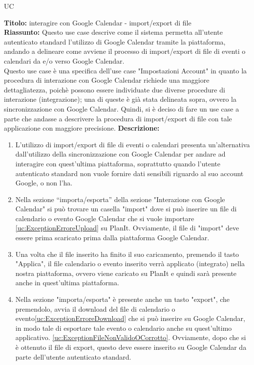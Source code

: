 \begin{listaPersonale}{UC}
\begin{listaPersonale2}[UC] {}
\begin{listaPersonale3} [UD]{}

            \textbf{Titolo: } interagire con Google Calendar - import/export di file\\
            \textbf{Riassunto: } Questo use case descrive come il sistema permetta all'utente autenticato standard l'utilizzo di Google Calendar tramite la piattaforma, andando a delineare come avviene il processo di import/export di file di eventi o calendari da e/o verso Google Calendar. \\
            Questo use case è una specifica dell'use case "Impostazioni Account" in quanto la procedura di interazione con Google Calendar richiede una maggiore dettagliatezza, poichè possono essere individuate due diverse procedure di interazione (integrazione); una di queste è già stata delineata sopra, ovvero la sincronizzazione con Google Calendar. Quindi, si è deciso di fare un use case a parte che andasse a descrivere la procedura di import/export di file con tale applicazione con maggiore precisione.
            \textbf{Descrizione: }
            \begin{enumerate}
                \item L'utilizzo di import/export di file di eventi o calendari presenta un'alternativa dall'utilizzo della sincronizzazione con Google Calendar per andare ad interagire con quest'ultima piattaforma, soprattutto quando l'utente autenticato standard non vuole fornire dati sensibili riguardo al suo account Google, o non l'ha.
                \item Nella sezione “importa/esporta” della sezione "Interazione con Google Calendar" si può trovare un casella "import" dove si può inserire un file di calendario o evento Google Calendar che si vuole importare \ref{uc:ExceptionErroreUpload} su PlanIt. Ovviamente, il file di "import" deve essere prima scaricato prima dalla piattaforma Google Calendar.
                \item Una volta che il file inserito ha finito il suo caricamento, premendo il tasto "Applica", il file calendario o evento inserito verrà applicato (integrato) nella nostra piattaforma, ovvero viene caricato su PlanIt e quindi sarà presente anche in quest'ultima piattaforma.
                \item Nella sezione "importa/esporta" è presente anche un tasto "export", che premendolo, avvia il download del file di calendario o evento\ref{uc:ExceptionErroreDownload} che si può inserire su Google Calendar, in modo tale di esportare tale evento o calendario anche su quest'ultimo applicativo. \ref{uc:ExceptionFileNonValidoOCorrotto}. Ovviamente, dopo che si è ottenuto il file di export, questo deve essere inserito su Google Calendar da parte dell'utente autenticato standard.
            \end{enumerate}
        \end{listaPersonale3}


\end{listaPersonale2}
\end{listaPersonale}
